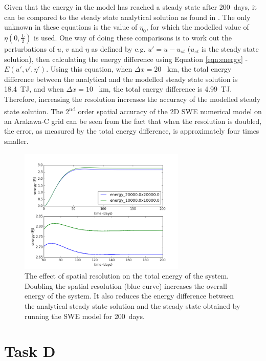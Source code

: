 \documentclass{article}
\newcommand{\ts}{\textsuperscript}
\begin{document}
Given that the energy in the model has reached a steady state after \SI{200}{days}, it can be
compared to the steady state analytical solution as found in \textcite{musgrave1985numerical}. The
only unknown in these equations is the value of $\eta_0$, for which the modelled value of $\eta(0,
\frac{L}{2})$ is used. One way of doing these comparisons is to work out the perturbations of $u$,
$v$ and $\eta$ as defined by e.g. $u' = u - u_{st}$ ($u_{st}$ is the steady state solution), then
calculating the energy difference using Equation \ref{eqn:energy} - $E(u', v', \eta')$. Using this
equation, when $\Delta x = 20$ \SI{}{km}, the total energy difference between the analytical and the
modelled steady state solution is \SI{18.4}{TJ}, and when $\Delta x = 10$ \SI{}{km}, the total
energy difference is \SI{4.99}{TJ}.  Therefore, increasing the resolution increases the accuracy of
the modelled steady state solution.  The 2\ts{nd} order spatial accuracy of the 2D SWE numerical
model on an Arakawa-C grid can be seen from the fact that when the resolution is doubled, the error,
as measured by the total energy difference, is approximately four times smaller. 

\begin{figure}[ht!]
    \centering
    \includegraphics[width=300px]{figures/task_b_energy}
    \caption{The effect of spatial resolution on the total energy of the system. Doubling the
    spatial resolution (blue curve) increases the overall energy of the system. It also reduces the
energy difference between the analytical steady state solution and the steady state obtained by
running the SWE model for \SI{200}{days}.}
    \label{fig:task_b_energy}
\end{figure}


\section*{Task D}
\end{document}

